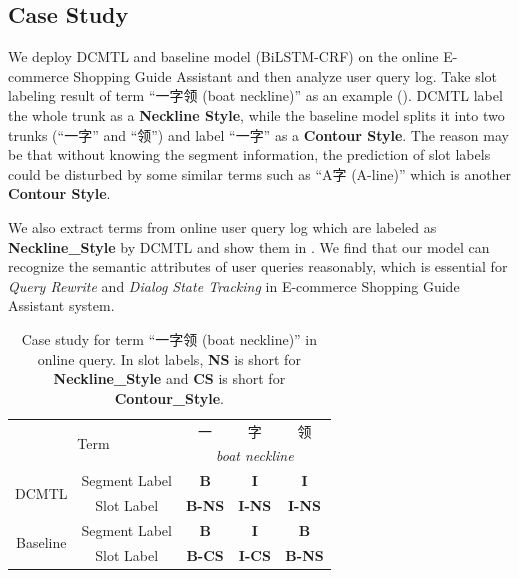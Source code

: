 
\subsection{Case Study}
We deploy DCMTL and baseline model (BiLSTM-CRF) on the online E-commerce Shopping Guide Assistant
and then analyze user query log.
Take slot labeling result of term ``一字领 (boat neckline)'' as an example 
().
DCMTL label the whole trunk as a \textbf{Neckline Style},
while the baseline model splits it into two trunks (``一字'' and ``领'') and label ``一字'' as a \textbf{Contour Style}.
The reason may be that without knowing the segment information,
the prediction of slot labels 
could be disturbed by some similar terms such as ``A字 (A-line)'' which is another \textbf{Contour Style}.

We also extract terms from online user query log which are labeled as \textbf{Neckline\_Style} by DCMTL and show them in .
We find that our model can recognize 
the semantic attributes of user queries reasonably,
which is essential for \emph{Query Rewrite} and \emph{Dialog State Tracking} in E-commerce Shopping Guide Assistant system.

\begin{table}[h]
	\centering
	\scriptsize
	\begin{tabular}{c|c|c|c|c}
		\toprule
		\multicolumn{2}{c|}{\multirow{2}{*}{Term}} & 一 & 字 & 领  \\
		\cmidrule{3-5}
		\multicolumn{2}{c|}{} & \multicolumn{3}{c}{\emph{boat neckline}} \\
		\midrule
		\multirow{2}{*}{DCMTL} & Segment Label & \textbf{B} & \textbf{I} & \textbf{I} \\
		\cmidrule{2-5}
		& Slot Label & \textbf{B-NS} & \textbf{I-NS} & \textbf{I-NS} \\
		\midrule
	 	\multirow{2}{*}{Baseline} & Segment Label & \textbf{B} & \textbf{I} & \textbf{B} \\
		\cmidrule{2-5}
		& Slot Label & \textbf{B-CS} & \textbf{I-CS} & \textbf{B-NS} \\
		\bottomrule
	\end{tabular}
	\caption{Case study for term ``一字领 (boat neckline)'' in online query.
		In slot labels, \textbf{NS} is short for \textbf{Neckline\_Style}
		and \textbf{CS} is short for \textbf{Contour\_Style}.}
	\label{tab:case_study}
	\vspace{-10pt}
\end{table}

